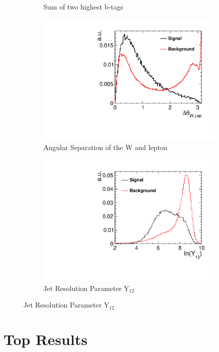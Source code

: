 \begin{figure}[ht]
\begin{subfigure}[b]{0.5\linewidth}
    \caption{Sum of two highest b-tags} 
  \end{subfigure}%
  \begin{subfigure}[b]{0.5\linewidth}
    \centering
    \includegraphics[width=0.75\linewidth]{Appendix/figures/WqqLepAngSep} 
    \caption{Angular Separation of the W and lepton} 
  \end{subfigure}
  \begin{subfigure}[b]{0.5\linewidth}
    \centering
    \includegraphics[width=0.75\linewidth]{Appendix/figures/Y12} 
    \caption{Jet Resolution Parameter Y$_{12}$} 
  \end{subfigure}%
\end{figure}

\section{Top Results}


